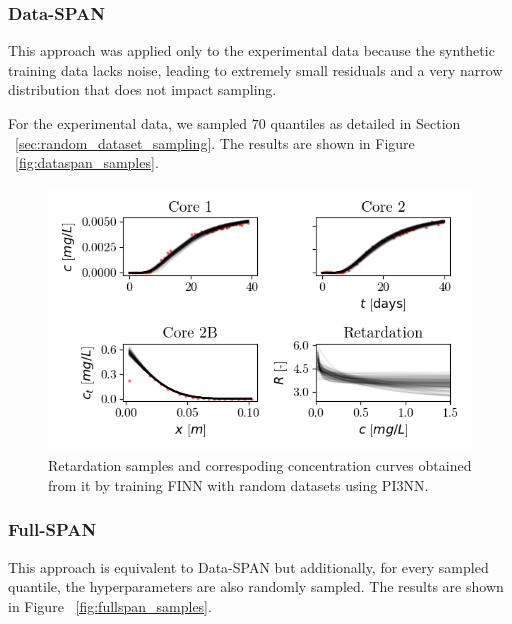\subsubsection{Data-SPAN}
This approach was applied only to the experimental data because the synthetic training data lacks noise, leading to extremely small residuals and a very narrow distribution that does not impact sampling. %

For the experimental data, we sampled $70$ quantiles as detailed in Section ~\vref{sec:random_dataset_sampling}. The results are shown in Figure ~\vref{fig:dataspan_samples}.


\begin{figure}[h]
    \centering
    \includegraphics{figs/finn_dataspan_samples.png}
    \caption{Retardation samples and correspoding concentration curves obtained from it by training FINN with random datasets using PI3NN.}
    \label{fig:dataspan_samples}
\end{figure}



\subsubsection{Full-SPAN}
This approach is equivalent to Data-SPAN but additionally, for every sampled quantile, the hyperparameters are also randomly sampled. The results are shown in Figure ~\vref{fig:fullspan_samples}.

